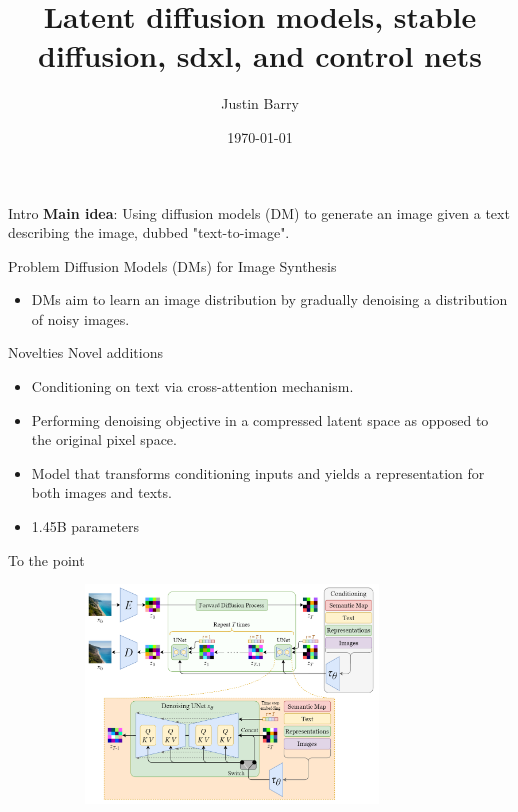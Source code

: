 \documentclass[8pt]{beamer}
\title{Latent diffusion models, stable diffusion, sdxl, and control nets}
\author{Justin Barry}
\date{\today}
\begin{document}
\begin{frame}[plain]
\maketitle
\end{frame}



\begin{frame}{Intro}
    \textbf{Main idea}: Using diffusion models (DM) to generate an image given a text describing the image, dubbed "text-to-image". 
\end{frame}



\begin{frame}{Problem}
    Diffusion Models (DMs) for Image Synthesis
    \begin{itemize}
        \item DMs aim to learn an image distribution by gradually denoising a distribution of noisy images.
    \end{itemize}
\end{frame}



\begin{frame}{Novelties}
    Novel additions ~\cite{rombach2022highresolution}
    \begin{itemize}
        \item Conditioning on text via cross-attention mechanism.
        \item Performing denoising objective in a compressed latent space as opposed to the original pixel space.
        \item Model that transforms conditioning inputs and yields a representation for both images and texts.
        \item 1.45B parameters
    \end{itemize}
\end{frame}



\begin{frame}{To the point}
   \begin{figure}
       \centering
       \includegraphics[width=276pt, height=165pt]{images/model.png}
       \label{fig:NN_training}
   \end{figure} 
   \cite{steins}
\end{frame}
\end{document}
